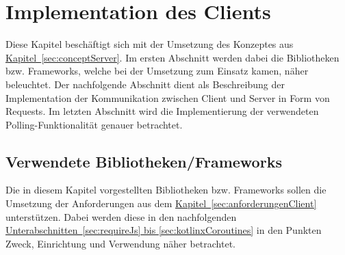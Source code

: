 
\chapter{Implementation des Clients}
Diese Kapitel beschäftigt sich mit der Umsetzung des Konzeptes aus \hyperref[sec:conceptServer]{Kapitel~\ref{sec:conceptServer}}. Im ersten Abschnitt werden dabei die Bibliotheken bzw. Frameworks, welche bei der Umsetzung zum Einsatz kamen, näher beleuchtet. Der nachfolgende Abschnitt dient als Beschreibung der Implementation der Kommunikation zwischen Client und Server in Form von Requests. Im letzten Abschnitt wird die Implementierung der verwendeten Polling-Funktionalität genauer betrachtet.

\section{Verwendete Bibliotheken/Frameworks}
Die in diesem Kapitel vorgestellten Bibliotheken bzw. Frameworks sollen die Umsetzung der Anforderungen aus dem \hyperref[sec:anforderungenClient]{Kapitel~\ref{sec:anforderungenClient}} unterstützen. Dabei werden diese in den nachfolgenden \hyperref[sec:requireJs, sec:kotlinxCoroutines]{Unterabschnitten~\ref{sec:requireJs} bis \ref{sec:kotlinxCoroutines}} in den Punkten Zweck, Einrichtung und Verwendung näher betrachtet.

